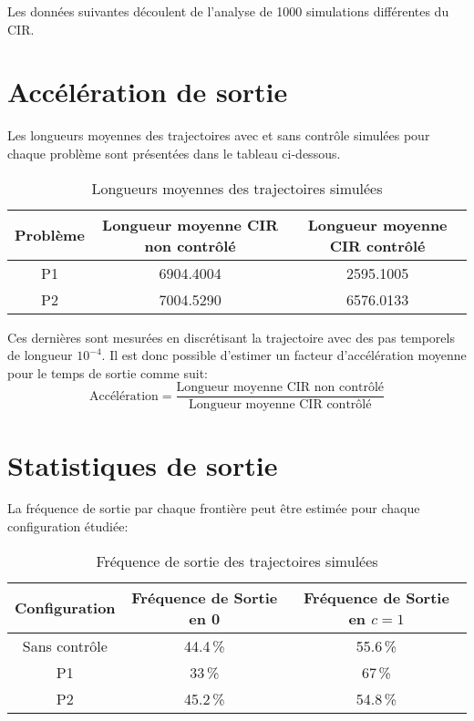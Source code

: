 \label{control_simulations}

Les données suivantes découlent de l'analyse de 1000 simulations différentes du \acs{CIR}. 

\section*{Accélération de sortie}
Les longueurs moyennes des trajectoires avec et sans contrôle simulées pour chaque problème sont présentées dans le tableau ci-dessous.
\begin{table}[htb]
        \centering
        \caption{Longueurs moyennes des trajectoires simulées}\label{tab:simulation_lengths}
        \renewcommand{\arraystretch}{1.4}
        \begin{tabular}{||c|c|c||}
        \hline
        Problème &
        Longueur moyenne CIR non contrôlé &
        Longueur moyenne CIR contrôlé \\
        \hline\hline
        P1 & 6904.4004 & 2595.1005 \\
        P2 & 7004.5290 & 6576.0133 \\
        \hline
        \end{tabular}
\end{table}\FloatBarrier Ces dernières sont mesurées en discrétisant la trajectoire avec des pas temporels de longueur $10^{-4}$. Il est donc possible d'estimer un facteur d'accélération moyenne pour le temps de sortie comme suit: 
\[
\text{Accélération}=\frac{\text{Longueur moyenne CIR non contrôlé}}{\text{Longueur moyenne CIR contrôlé}}
\]

\section*{Statistiques de sortie}
La fréquence de sortie par chaque frontière peut être estimée pour chaque configuration étudiée:
\begin{table}[htb]
    \centering
    \caption{Fréquence de sortie des trajectoires simulées}\label{tab:simulation_exit_frequency}
    \renewcommand{\arraystretch}{1.4}
    \begin{tabular}{||c|c|c||}
        \hline
        Configuration & Fréquence de Sortie en 0 & Fréquence de Sortie en $c=1$ \\
        \hline\hline
        Sans contrôle & 44.4\,\% & 55.6\,\% \\
        P1 & 33\,\% & 67\,\% \\
        P2 & 45.2\,\% & 54.8\,\% \\
        \hline
    \end{tabular}
\end{table}